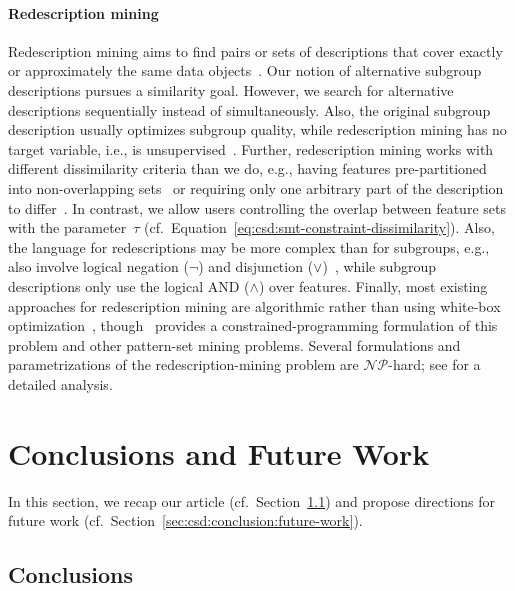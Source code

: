 \documentclass{article}
\theoremstyle{definition}
\begin{document}
\paragraph{Redescription mining}

Redescription mining aims to find pairs or sets of descriptions that cover exactly or approximately the same data objects~\cite{galbrun2017redescription, ramakrishnan2004turning}.
Our notion of alternative subgroup descriptions pursues a similarity goal.
However, we search for alternative descriptions sequentially instead of simultaneously.
Also, the original subgroup description usually optimizes subgroup quality, while redescription mining has no target variable, i.e., is unsupervised~\cite{ramakrishnan2004turning}.
Further, redescription mining works with different dissimilarity criteria than we do, e.g., having features pre-partitioned into non-overlapping sets~\cite{galbrun2017redescription, gallo2008finding, mihelcic2023complexity} or requiring only one arbitrary part of the description to differ~\cite{parida2005redescription}.
In contrast, we allow users controlling the overlap between feature sets with the parameter~$\tau$ (cf.~Equation~\ref{eq:csd:smt-constraint-dissimilarity}).
Also, the language for redescriptions may be more complex than for subgroups, e.g., also involve logical negation ($\lnot$) and disjunction ($\lor$)~\cite{galbrun2017redescription, gallo2008finding}, while subgroup descriptions only use the logical AND ($\land$) over features.
Finally, most existing approaches for redescription mining are algorithmic rather than using white-box optimization~\cite{galbrun2017redescription, mihelcic2023complexity}, though~\cite{guns2013kpattern} provides a constrained-programming formulation of this problem and other pattern-set mining problems.
Several formulations and parametrizations of the redescription-mining problem are $\mathcal{NP}$-hard; see \cite{mihelcic2023complexity} for a detailed analysis.

\section{Conclusions and Future Work}
\label{sec:csd:conclusion}

In this section, we recap our article (cf.~Section~\ref{sec:csd:conclusion:conclusion}) and propose directions for future work (cf.~Section~\ref{sec:csd:conclusion:future-work}).

\subsection{Conclusions}
\label{sec:csd:conclusion:conclusion}
\end{document}
